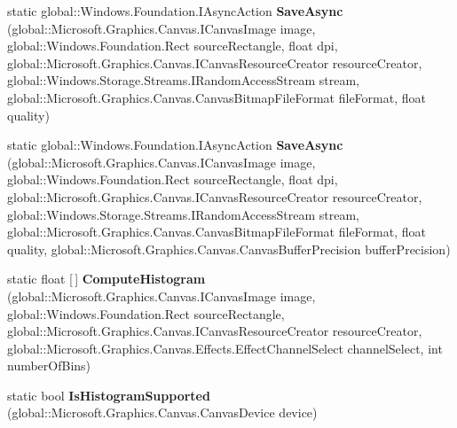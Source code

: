 \begin{DoxyCompactItemize}
static global\+::\+Windows.\+Foundation.\+I\+Async\+Action {\bfseries Save\+Async} (global\+::\+Microsoft.\+Graphics.\+Canvas.\+I\+Canvas\+Image image, global\+::\+Windows.\+Foundation.\+Rect source\+Rectangle, float dpi, global\+::\+Microsoft.\+Graphics.\+Canvas.\+I\+Canvas\+Resource\+Creator resource\+Creator, global\+::\+Windows.\+Storage.\+Streams.\+I\+Random\+Access\+Stream stream, global\+::\+Microsoft.\+Graphics.\+Canvas.\+Canvas\+Bitmap\+File\+Format file\+Format, float quality)
\item 
\mbox{\label{class_microsoft_1_1_graphics_1_1_canvas_1_1_canvas_image_a762e42f02f39504e92616098985cf683}} 
static global\+::\+Windows.\+Foundation.\+I\+Async\+Action {\bfseries Save\+Async} (global\+::\+Microsoft.\+Graphics.\+Canvas.\+I\+Canvas\+Image image, global\+::\+Windows.\+Foundation.\+Rect source\+Rectangle, float dpi, global\+::\+Microsoft.\+Graphics.\+Canvas.\+I\+Canvas\+Resource\+Creator resource\+Creator, global\+::\+Windows.\+Storage.\+Streams.\+I\+Random\+Access\+Stream stream, global\+::\+Microsoft.\+Graphics.\+Canvas.\+Canvas\+Bitmap\+File\+Format file\+Format, float quality, global\+::\+Microsoft.\+Graphics.\+Canvas.\+Canvas\+Buffer\+Precision buffer\+Precision)
\item 
\mbox{\label{class_microsoft_1_1_graphics_1_1_canvas_1_1_canvas_image_ac93dfecc525eae062c86e25f3af30682}} 
static float \mbox{[}$\,$\mbox{]} {\bfseries Compute\+Histogram} (global\+::\+Microsoft.\+Graphics.\+Canvas.\+I\+Canvas\+Image image, global\+::\+Windows.\+Foundation.\+Rect source\+Rectangle, global\+::\+Microsoft.\+Graphics.\+Canvas.\+I\+Canvas\+Resource\+Creator resource\+Creator, global\+::\+Microsoft.\+Graphics.\+Canvas.\+Effects.\+Effect\+Channel\+Select channel\+Select, int number\+Of\+Bins)
\item 
\mbox{\label{class_microsoft_1_1_graphics_1_1_canvas_1_1_canvas_image_aff3e5210428f12ae587c08a1c3b26c85}} 
static bool {\bfseries Is\+Histogram\+Supported} (global\+::\+Microsoft.\+Graphics.\+Canvas.\+Canvas\+Device device)
\item 
\mbox{\label{class_microsoft_1_1_graphics_1_1_canvas_1_1_canvas_image_a30ada8b24e212bcbdc24f994e66ad191}} 

\end{DoxyCompactItemize}
